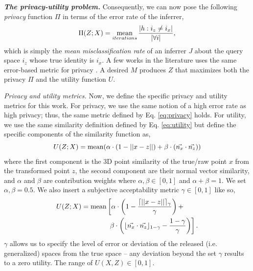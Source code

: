 
\emph{\textbf{The privacy-utility problem.}} Consequently, we can now pose the following \textit{privacy} function $\Pi$ in terms of the error rate of the inferrer,
\begin{equation}
	\Pi (Z;X) = \operatorname*{mean}_ {iterations} \frac{|h: i_z \neq i_x|}{|\forall i|},
	\label{eq:privacy}
\end{equation}
which is simply the \textit{mean misclassification rate} of an inferrer $J$ about the query space $i_z$ whose true identity is $i_x$. A few works in the literature uses the same error-based metric for privacy \cite{Wagner:2018:TPM:3212709.3168389, shokri2011quantifying, narayanan2009deanonymizing}. A desired $M$ produces $Z$ that maximizes both the privacy $\Pi$ and the utility function $U$.

\emph{Privacy and utility metrics.} Now, we define the specific privacy and utility metrics for this work. For privacy, we use the same notion of a high error rate as high privacy; thus, the same metric defined by Eq. \ref{eq:privacy} holds. For utility, we use the same similarity definition defined by Eq. \ref{eq:utility} but define the specific components of the similarity function as,
\begin{equation}
U(Z;X) = \operatorname*{mean} ( \alpha \cdot (1 - ||x - z||) + \beta \cdot (\vec{n_x} \cdot \vec{n_z}) )	
\end{equation}
where the first component is the 3D point similarity of the true/raw point $x$ from the transformed point $z$, the second component are their normal vector similarity, and $\alpha$ and $\beta$ are contribution weights where $\alpha, \beta \in \left[0,1\right]$ and $\alpha + \beta  = 1$. We set $\alpha, \beta = 0.5$. We also insert a subjective acceptability metric $\gamma \in \left[0,1\right]$ like so,
\begin{equation}
\begin{aligned}
U(Z;X) = \operatorname*{mean} \left[ \alpha \cdot \left(1 - \frac{\lceil||x - z||\rceil_{\gamma}}{\gamma}\right) + \right. \hspace{7mm}\\
\left. \beta \cdot \left(\lfloor\vec{n_x} \cdot \vec{n_z}\rfloor_{1-\gamma} - \frac{1-\gamma}{\gamma}\right) \right] .
\end{aligned}
\label{eq:utility-by-sim}
\end{equation}
$\gamma$ allows us to specify the level of error or deviation of the released (i.e. generalized) spaces from the true space -- any deviation beyond the set $\gamma$ results to a zero utility. The range of $U(X,Z) \in \left[0,1\right]$.

